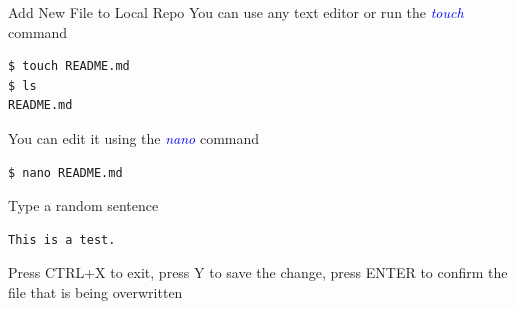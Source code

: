 \documentclass[11pt]{beamer}
\begin{document}
\begin{frame}[fragile]{Add New File to Local Repo}
You can use any text editor or run the \textcolor{blue}{\emph{touch}} command
\begin{lstlisting}
$ touch README.md
$ ls
README.md
\end{lstlisting}
You can edit it using the \textcolor{blue}{\emph{nano}} command
\begin{lstlisting}
$ nano README.md
\end{lstlisting}
Type a random sentence
\begin{lstlisting}
This is a test.
\end{lstlisting}
Press CTRL+X to exit, press Y to save the change, press ENTER to confirm the file that is being overwritten
\end{frame}
\end{document}
